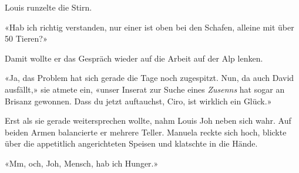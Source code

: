 Louis runzelte die Stirn.

«Hab ich richtig verstanden, nur einer ist oben bei den Schafen, alleine
mit über 50 Tieren?»

Damit wollte er das Gespräch wieder auf die Arbeit auf der Alp lenken.

«Ja, das Problem hat sich gerade die Tage noch zugespitzt. Nun, da auch
David ausfällt,» sie atmete ein, «unser Inserat
zur Suche eines \emph{Zusenns} hat sogar an Brisanz gewonnen. Dass du
jetzt auftauchst, Ciro, ist wirklich ein Glück.»

Erst als sie gerade weitersprechen wollte, nahm Louis Joh neben sich
wahr. Auf beiden Armen balancierte er mehrere Teller. Manuela reckte
sich hoch, blickte über die appetitlich angerichteten Speisen und
klatschte in die Hände.

«Mm, och, Joh, Mensch, hab ich Hunger.»
